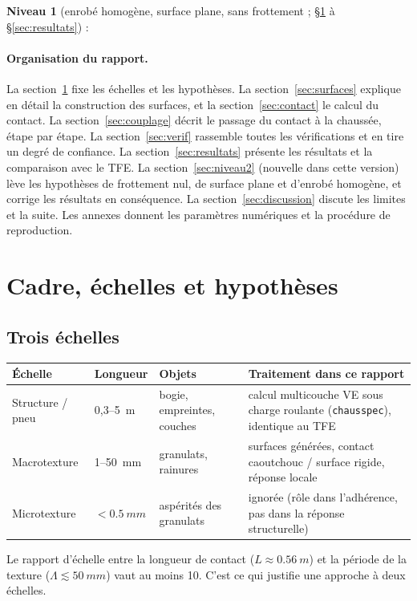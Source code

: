 \documentclass[11pt,a4paper]{article}
\newcommand{\cs}{\texttt{chausspec}}
\begin{document}
\noindent\textbf{Niveau 1} (enrobé homogène, surface plane, sans frottement ; \S\ref{sec:cadre} à \S\ref{sec:resultats}) :



\paragraph{Organisation du rapport.} La section~\ref{sec:cadre} fixe les échelles et les
hypothèses. La section~\ref{sec:surfaces} explique en détail la construction des surfaces, et la
section~\ref{sec:contact} le calcul du contact. La section~\ref{sec:couplage} décrit le passage du
contact à la chaussée, étape par étape. La section~\ref{sec:verif} rassemble toutes les
vérifications et en tire un degré de confiance. La section~\ref{sec:resultats} présente les
résultats et la comparaison avec le TFE. La section~\ref{sec:niveau2} (nouvelle dans cette
version) lève les hypothèses de frottement nul, de surface plane et d'enrobé homogène, et corrige
les résultats en conséquence. La section~\ref{sec:discussion} discute les limites et la
suite. Les annexes donnent les paramètres numériques et la procédure de reproduction.

\section{Cadre, échelles et hypothèses}\label{sec:cadre}
\subsection{Trois échelles}
\begin{center}\small
\begin{tabular}{p{2.6cm}p{2.3cm}p{4.3cm}p{5.2cm}}
\toprule
Échelle & Longueur & Objets & Traitement dans ce rapport\\
\midrule
Structure / pneu & 0,3--\SI{5}{m} & bogie, empreintes, couches & calcul multicouche VE sous charge roulante (\cs), identique au TFE\\
Macrotexture & 1--\SI{50}{mm} & granulats, rainures & surfaces générées, contact caoutchouc / surface rigide, réponse locale\\
Microtexture & $<\SI{0.5}{mm}$ & aspérités des granulats & ignorée (rôle dans l'adhérence, pas dans la réponse structurelle)\\
\bottomrule
\end{tabular}
\end{center}
Le rapport d'échelle entre la longueur de contact ($L\approx\SI{0.56}{m}$) et la période de la
texture ($\Lambda\lesssim\SI{50}{mm}$) vaut au moins 10. C'est ce qui justifie une approche à deux
échelles.
\end{document}
